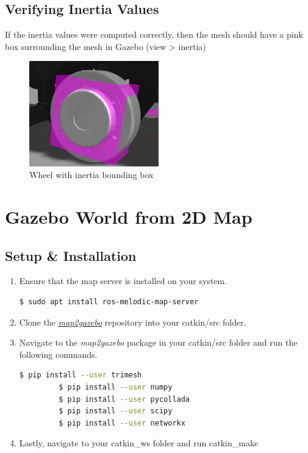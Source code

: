 \documentclass[11pt]{article}
\begin{document}
\subsection{Verifying Inertia Values}
If the inertia values were computed correctly, then the mesh should have a pink box surrounding the mesh in Gazebo (view > inertia)
\begin{figure}[!h]
 \centering
 \includegraphics[width=0.5\textwidth]{images/inertiawheel}
 \caption{Wheel with inertia bounding box}
\end{figure}

\section{Gazebo World from 2D Map}
\subsection{Setup \& Installation}

\begin{enumerate}
 \item{
       Ensure that the map server is installed on your system.
       \begin{lstlisting}[language=bash]
     $ sudo apt install ros-melodic-map-server
       \end{lstlisting}
       }
 \item{
       Clone the \href{https://github.com/SynapseProgramming/map2gazebo.git
       }{\emph{map2gazebo}} repository into your catkin/src folder.
       
       }
 \item{
       Navigate to the \emph{map2gazebo} package in your catkin/src folder and run the following commands.
       
       \begin{lstlisting}[language=bash]
         $ pip install --user trimesh
         $ pip install --user numpy
         $ pip install --user pycollada
         $ pip install --user scipy
         $ pip install --user networkx
       \end{lstlisting}
       }
 \item{
       Lastly, navigate to your catkin\_ws folder and run catkin\_make
       }
\end{enumerate}
\end{document}
